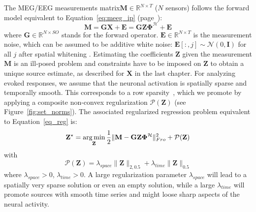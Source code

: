 The MEG/EEG measurements matrix$\mathbf{M} \in \mathbb{R}^{N \times T}$ ($N$ sensors) follows the forward model equivalent to Equation~\eqref{eq:meeg_ip} (page~\pageref{eq:meeg_ip}):
\begin{equation} \label{eq:reg_prob_tf}
    \mathbf{M} = \mathbf{GX} + \mathbf{E} = \mathbf{GZ \Phi}^{\mathcal{H}} + \mathbf{E}
\end{equation}
where $\mathbf{G} \in \mathbb{R}^{N \times SO}$ stands for the forward operator. $\mathbf{E} \in \mathbb{R}^{N \times T}$ is the measurement noise, which can be assumed to be additive white noise: $\mathbf{E}[:, j] \sim \mathcal{N}(0, \mathbf{I})$ for all $j$ after spatial whitening \cite{denis}. Estimating the coefficients $\mathbf{Z}$ given the measurement $\mathbf{M}$ is an ill-posed problem and constraints have to be imposed on $\mathbf{Z}$ to obtain a unique source estimate, as described for $\mathbf{X}$ in the last chapter. For analyzing evoked responses, we assume that the neuronal activation is spatially sparse and temporally smooth. This corresponds to a row sparsity~\cite{Alex13}, which we promote by applying a composite non-convex regularization $\mathcal{P}(\mathbf{Z})$ (see Figure~\ref{fig:set_norms}). The associated regularized regression problem equivalent to Equation~\eqref{eq_reg} is:
\begin{equation} \label{eq:penalized_reg_tf}
    \mathbf{Z}^\star = \mathop{\mathrm{arg}\,\mathrm{min}}_{\mathbf{Z}} \frac{1}{2}\|\mathbf{M - GZ\Phi^\mathcal{H}}\|^2_{Fro} + \mathcal{P}(\mathbf{Z})
\end{equation}
with
\begin{equation}
	\mathcal{P}(\mathbf{Z}) = \lambda_{space}\|\mathbf{Z}\|_{2,0.5} + \lambda_{time}\|\mathbf{Z}\|_{0.5}
\end{equation}
where $\lambda_{space} > 0$, $\lambda_{time}>0$. A large regularization parameter $\lambda_{space}$ will lead to a spatially very sparse solution or even an empty solution, while a large $\lambda_{time}$ will promote sources with smooth time series and might loose sharp aspects of the neural activity.


